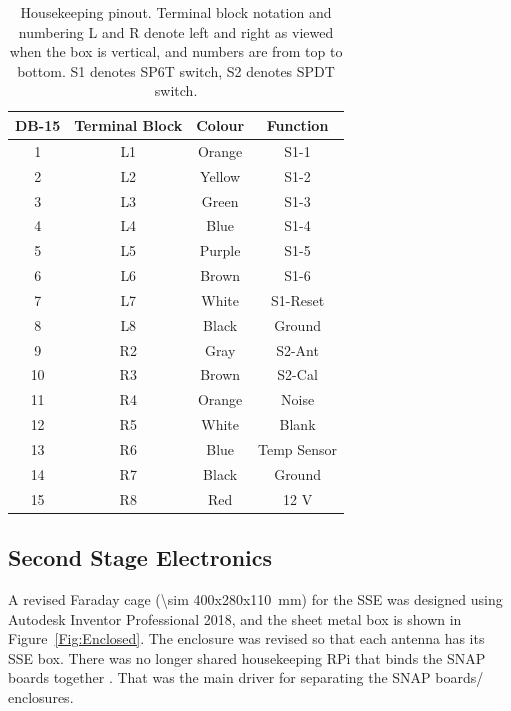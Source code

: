 \begin{table}
	\centering
	\begin{tabular}{ c|c|c|c} 
		\hline
		DB-15 & Terminal Block & Colour & Function \\
		\hline
		\hline
		1 & L1 & Orange & S1-1 \\ 
		2 & L2 & Yellow & S1-2 \\ 
		3 & L3 & Green & S1-3 \\
		4 & L4 & Blue & S1-4 \\
		5 & L5 & Purple & S1-5 \\
		6 & L6 & Brown & S1-6 \\
		7 & L7 & White & S1-Reset \\
		8 & L8 & Black & Ground \\
		9 & R2 & Gray & S2-Ant \\
		10 & R3 & Brown & S2-Cal \\
		11 & R4 & Orange & Noise \\
		12 & R5 & White & Blank \\
		13 & R6 & Blue & Temp Sensor \\
		14 & R7 & Black & Ground \\
		15 & R8 & Red & 12 V \\
		\hline
	\end{tabular}
	\caption{Housekeeping pinout. Terminal block notation and numbering L and R denote left and right as viewed when the box is vertical, and numbers are from top to bottom. S1 denotes SP6T switch, S2 denotes SPDT switch.}
	\label{Tab:Pinout}
\end{table}


\subsection{Second Stage Electronics}

A revised Faraday cage (\SI{\sim 400x280x110}{\milli \meter})  for the SSE was designed using Autodesk Inventor Professional 2018, and the sheet metal box is shown in Figure~\ref{Fig:Enclosed}. The enclosure was revised so that each antenna has its SSE box.  There was no longer shared housekeeping RPi that binds the SNAP boards together . That was the main driver for separating the SNAP boards/ enclosures.  

